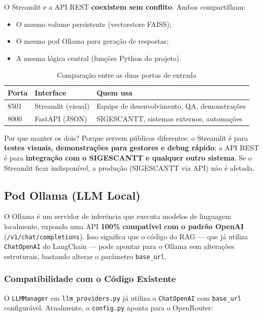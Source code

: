 \documentclass[12pt, a4paper]{article}
\begin{document}
O Streamlit e a API REST \textbf{coexistem sem conflito}. Ambos compartilham:

\begin{itemize}
  \item O mesmo volume persistente (vectorstore FAISS);
  \item O mesmo pod Ollama para geração de respostas;
  \item A mesma lógica central (funções Python do projeto).
\end{itemize}

\begin{table}[H]
\centering
\small
\caption{Comparação entre as duas portas de entrada}
\label{tab:portas}
\begin{tabularx}{\textwidth}{l l X}
\toprule
\textbf{Porta} & \textbf{Interface} & \textbf{Quem usa} \\
\midrule
8501 & Streamlit (visual) & Equipe de desenvolvimento, QA, demonstrações \\
8000 & FastAPI (JSON) & SIGESCANTT, sistemas externos, automações \\
\bottomrule
\end{tabularx}
\end{table}

Por que manter os dois? Porque servem públicos diferentes: o Streamlit é para \textbf{testes visuais, demonstrações para gestores e debug rápido}; a API REST é para \textbf{integração com o SIGESCANTT e qualquer outro sistema}. Se o Streamlit ficar indisponível, a produção (SIGESCANTT via API) não é afetada.

\subsection{Pod Ollama (LLM Local)}

O Ollama é um servidor de inferência que executa modelos de linguagem localmente, expondo uma API \textbf{100\% compatível com o padrão OpenAI} (\texttt{/v1/chat/completions}). Isso significa que o código do RAG --- que já utiliza \texttt{ChatOpenAI} do LangChain --- pode apontar para o Ollama sem alterações estruturais, bastando alterar o parâmetro \texttt{base\_url}.

\subsubsection*{Compatibilidade com o Código Existente}

O \texttt{LLMManager} em \texttt{llm\_providers.py} já utiliza o \texttt{ChatOpenAI} com \texttt{base\_url} configurável. Atualmente, o \texttt{config.py} aponta para o OpenRouter:
\end{document}
